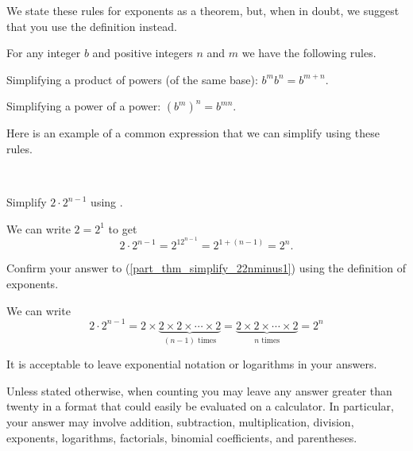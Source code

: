 We state these rules for exponents as a theorem, but, when in doubt, we suggest that you use the definition instead.

\begin{thm}
\label{thm_simplify_exp}
    For any integer $b$ and positive integers $n$ and $m$ we have the following rules.
        \begin{apart}
            \item Simplifying a product of powers (of the same base): $b^mb^n=b^{m+n}$.
            \item Simplifying a power of a power: $\left(b^m\right)^n=b^{mn}$.
        \end{apart}
\end{thm}

Here is an example of a common expression that we can simplify using these rules.

\begin{exam}
\label{exam_simplify_22nminus1}   
~
    \begin{apart}
        \item \label{part_thm_simplify_22nminus1} Simplify $2\cdot2^{n-1}$ using .
            \begin{soln}
                We can write $2=2^1$ to get
                    $$2\cdot2^{n-1} = 2^12^{n-1}=2^{1+(n-1)}=2^n.$$
            \end{soln}
        \item Confirm your answer to (\ref{part_thm_simplify_22nminus1}) using the definition of exponents.
            \begin{soln}
                We can write 
                    $$2\cdot2^{n-1} 
                    = 2 \times 
                    \underbrace{2 \times 2 \times \cdots \times 2}_{(n-1) \text{ times}} 
                    = \underbrace{2 \times 2 \times \cdots \times 2}_{n \text{ times}}
                    =2^n$$
            \end{soln}
    \end{apart}
\end{exam}

It is acceptable to leave exponential notation or logarithms in your answers.

\begin{rem} 
\label{rem_not_eval_counts_final}
Unless stated otherwise, when counting you may leave any answer greater than twenty in a format that could easily be evaluated on a calculator. In particular, your answer may involve addition, subtraction, multiplication, division, exponents, logarithms, factorials, binomial coefficients, and parentheses.
\end{rem}

